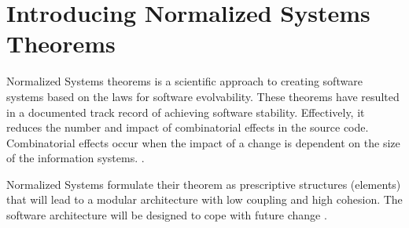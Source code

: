 \section{Introducing Normalized Systems Theorems}

Normalized Systems theorems is a scientific approach to creating software systems based on
the laws for software evolvability. These theorems have resulted in a documented track
record of achieving software stability. Effectively, it reduces the number and impact of
combinatorial effects in the source code. Combinatorial effects occur when the impact of a
change is dependent on the size of the information systems.
\parencite[]{mannaert_normalized_2009}. 

Normalized Systems formulate their theorem as prescriptive structures (elements)
that will lead to a modular architecture with low coupling and high cohesion. The
software architecture will be designed to cope with future change
\parencites[]{mannaert_normalized_2009}.         